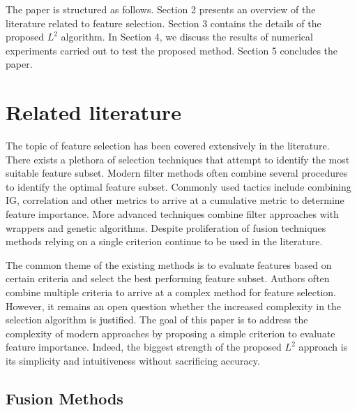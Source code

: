 \documentclass[review]{elsarticle}
\begin{document}
The paper is structured as follows. Section 2 presents an overview of the literature related to feature selection. Section 3 contains the details of the proposed $ L^2 $ algorithm. In Section 4, we discuss the results of numerical experiments carried out to test the proposed method. Section 5 concludes the paper.

\section{Related literature}

The topic of feature selection has been covered extensively in the literature. There exists a plethora of selection techniques that attempt to identify the most suitable feature subset. Modern filter methods often combine several procedures to identify the optimal feature subset. Commonly used tactics include combining IG, correlation and other metrics to arrive at a cumulative metric to determine feature importance.  More advanced techniques combine filter approaches with wrappers and genetic algorithms. Despite proliferation of fusion techniques methods relying on a single criterion continue to be used in the literature. 

The common theme of the existing methods is to evaluate features based on certain criteria and select the best performing feature subset. Authors often combine multiple criteria to arrive at a complex method for feature selection. However, it remains an open question whether the increased complexity in the selection algorithm is justified. The goal of this paper is to address the complexity of modern approaches by proposing a simple criterion to evaluate feature importance. Indeed, the biggest strength of the proposed $ L^2 $ approach is its simplicity and intuitiveness without sacrificing accuracy.

\subsection{Fusion Methods}
\end{document}
